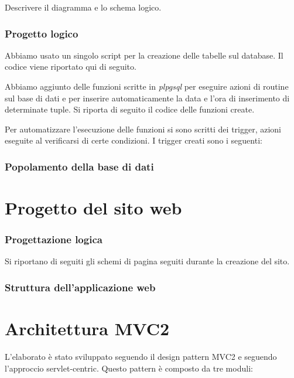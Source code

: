 \documentclass[a4paper,10pt]{article}
\begin{document}
Descrivere il diagramma e lo schema logico.

\section{Progetto logico}

Abbiamo usato un singolo script per la creazione delle tabelle sul database. Il codice viene riportato qui di seguito.



Abbiamo aggiunto delle funzioni scritte in \textit{plpgsql} per eseguire azioni di routine sul base di dati e per inserire automaticamente la data e l'ora di inserimento di determinate tuple.
Si riporta di seguito il codice delle funzioni create.


Per automatizzare l'esecuzione delle funzioni si sono scritti dei trigger, azioni eseguite al verificarsi di certe condizioni. I trigger creati sono i seguenti:


\section{Popolamento della base di dati}

\part{Progetto del sito web}

\section{Progettazione logica}

Si riportano di seguiti gli schemi di pagina seguiti durante la creazione del sito.

\section{Struttura dell'applicazione web}

\part{Architettura MVC2}
L'elaborato \`e stato sviluppato seguendo il design pattern MVC2 e seguendo l'approccio servlet-centric. Questo pattern \`e composto da tre moduli:
\end{document}
